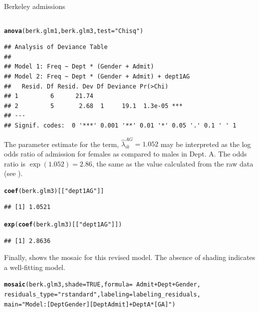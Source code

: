 \documentclass[11pt]{book}\usepackage[]{graphicx}\usepackage[]{color}
\makeatletter
\newcommand{\hlnum}[1]{\textcolor[rgb]{0.686,0.059,0.569}{#1}}%
\newcommand{\hlstr}[1]{\textcolor[rgb]{0.192,0.494,0.8}{#1}}%
\newcommand{\hlopt}[1]{\textcolor[rgb]{0,0,0}{#1}}%
\newcommand{\hlstd}[1]{\textcolor[rgb]{0.345,0.345,0.345}{#1}}%
\newcommand{\hlkwc}[1]{\textcolor[rgb]{0.333,0.667,0.333}{#1}}%
\newcommand{\hlkwd}[1]{\textcolor[rgb]{0.737,0.353,0.396}{\textbf{#1}}}%
\newenvironment{kframe}{%
 \def\at@end@of@kframe{}%
 \ifinner\ifhmode%
  \def\at@end@of@kframe{\end{minipage}}%
  \begin{minipage}{\columnwidth}%
 \fi\fi%
 \def\FrameCommand##1{\hskip\@totalleftmargin \hskip-\fboxsep
 \colorbox{shadecolor}{##1}\hskip-\fboxsep
     \hskip-\linewidth \hskip-\@totalleftmargin \hskip\columnwidth}%
 \MakeFramed {\advance\hsize-\width
   \@totalleftmargin\z@ \linewidth\hsize
   \@setminipage}}%
 {\par\unskip\endMakeFramed%
 \at@end@of@kframe}
\newenvironment{knitrout}{}{} %
\renewenvironment{knitrout}{\small\renewcommand{\baselinestretch}{.85}}{} %
\makeatother
\begin{document}
\begin{Example}[berkeley6]{Berkeley admissions}
\begin{knitrout}
\begin{kframe}
\begin{verbatim}
\end{verbatim}
\begin{alltt}
\hlkwd{anova}\hlstd{(berk.glm1, berk.glm3,} \hlkwc{test}\hlstd{=}\hlstr{"Chisq"}\hlstd{)}
\end{alltt}
\begin{verbatim}
## Analysis of Deviance Table
## 
## Model 1: Freq ~ Dept * (Gender + Admit)
## Model 2: Freq ~ Dept * (Gender + Admit) + dept1AG
##   Resid. Df Resid. Dev Df Deviance Pr(>Chi)    
## 1         6      21.74                         
## 2         5       2.68  1     19.1  1.3e-05 ***
## ---
## Signif. codes:  0 '***' 0.001 '**' 0.01 '*' 0.05 '.' 0.1 ' ' 1
\end{verbatim}
\end{kframe}
\end{knitrout}
The parameter estimate for the  term,
$\widehat{\lambda}_{ik}^{AG} = 1.052$ may be interpreted as
the log odds ratio of admission for females as compared to males in Dept. A.
The odds ratio is $\exp(1.052) = 2.86$, the same as the value calculated from the
raw data (see ).
\begin{knitrout}
\color{fgcolor}\begin{kframe}
\begin{alltt}
\hlkwd{coef}\hlstd{(berk.glm3)[[}\hlstr{"dept1AG"}\hlstd{]]}
\end{alltt}
\begin{verbatim}
## [1] 1.0521
\end{verbatim}
\begin{alltt}
\hlkwd{exp}\hlstd{(}\hlkwd{coef}\hlstd{(berk.glm3)[[}\hlstr{"dept1AG"}\hlstd{]])}
\end{alltt}
\begin{verbatim}
## [1] 2.8636
\end{verbatim}
\end{kframe}
\end{knitrout}
Finally,  shows the mosaic for this revised model.
The absence of shading indicates a well-fitting model.
\begin{knitrout}
\color{fgcolor}\begin{kframe}
\begin{alltt}
\hlkwd{mosaic}\hlstd{(berk.glm3,} \hlkwc{shade}\hlstd{=}\hlnum{TRUE}\hlstd{,} \hlkwc{formula}\hlstd{=}\hlopt{~}\hlstd{Admit}\hlopt{+}\hlstd{Dept}\hlopt{+}\hlstd{Gender,}
       \hlkwc{residuals_type}\hlstd{=}\hlstr{"rstandard"}\hlstd{,} \hlkwc{labeling}\hlstd{=labeling_residuals,}
       \hlkwc{main}\hlstd{=}\hlstr{"Model: [DeptGender][DeptAdmit] + DeptA*[GA]"}\hlstd{)}
\end{alltt}
\end{kframe}\begin{figure}[!htb]



\end{figure}
\end{knitrout}
\end{Example}
\end{document}
